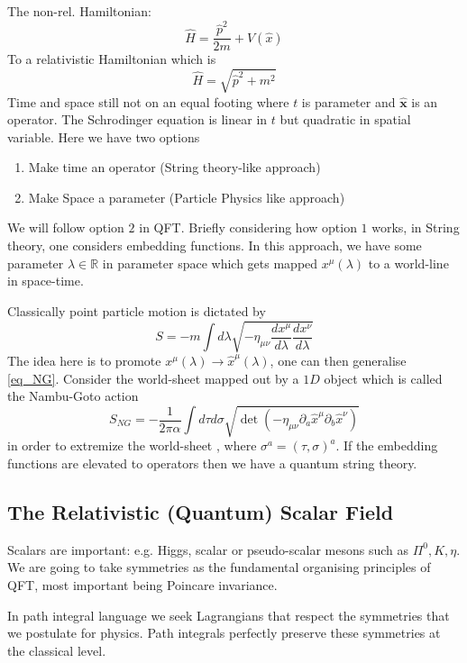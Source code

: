 The non-rel. Hamiltonian:
$$\hat{H} = \frac{\hat{p}^2}{2m} + V(\hat{x})$$ To a relativistic Hamiltonian which is
$$\hat{H}  = \sqrt{\hat{p}^2 + m^2}$$ Time and space still not on an equal footing  where $t$ is parameter and $\bm{\hat{x}}$ is an operator. The Schrodinger equation is linear in $t$ but quadratic in spatial variable.  Here we have two options
\begin{enumerate}
    \item Make time an operator (String theory-like approach)
    \item Make Space a parameter (Particle Physics like approach)
\end{enumerate}
We will follow option $2$ in QFT.  Briefly considering how option $1$ works, in String theory, one considers embedding functions. In this approach, we have some parameter $\lambda \in \mathbb{R}$ in parameter space which gets mapped $x^{\mu}(\lambda)$ to a world-line in space-time. 

Classically point particle motion is dictated by
\begin{equation}\label{eq_NG}
    S = -m\int d\lambda \sqrt{-\eta_{\mu \nu} \frac{dx^\mu}{d\lambda}\frac{dx^\nu}{d\lambda}  }
\end{equation}
The idea here is to promote $x^{\mu}(\lambda) \to \hat{x}^{\mu}(\lambda)$, one can then generalise \eqref{eq_NG}. Consider the world-sheet mapped out by a $1D$ object which is called the Nambu-Goto action
\begin{equation}
    S_{NG} = -\frac{1}{2\pi \alpha} \int d\tau d\sigma \sqrt{\det\left( - \eta_{\mu \nu} \partial_{a} \hat{x}^\mu \partial_b \hat{x}^\nu\right) }
\end{equation}
in order to extremize the world-sheet , where $\sigma^a = (\tau, \sigma)^a$. If the embedding functions are elevated to operators then we have a quantum string theory. 

\subsection{The Relativistic (Quantum) Scalar Field}
Scalars are important: e.g. Higgs, scalar or pseudo-scalar mesons such as $\Pi^0, K, \eta$. We are going to take symmetries as the fundamental organising principles of QFT, most important being Poincare invariance.

In path integral language we seek Lagrangians that respect the symmetries that we postulate for physics. Path integrals perfectly preserve these symmetries at the classical level.

